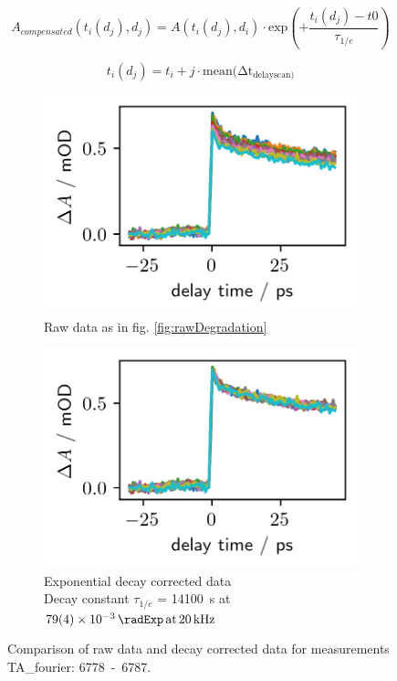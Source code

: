\documentclass[twoside,openright]{scrreprt}
\def\pumpExp#1{\ensuremath{\SI{#1}{\radExp}\,\mathrm{at}\, \SI{20}{\kilo\hertz}}}
\begin{document}
{\begin{equation}\label{eq:degradationCompensation}
A_{compensated}(t_i(d_j), d_j) = A(t_i(d_j), d_i)\cdot \mathrm{exp}\left(+\frac{t_i(d_j)-t0}{\tau_{1/e}}\right)
\end{equation}

\begin{equation*}
t_i(d_j) = t_i + j\cdot \mathrm{mean(\Delta t_{delay scan)}}
\end{equation*}

\begin{figure}[hbtp]
\centering
\begin{subfigure}[t]{0.4\linewidth}
\centering
\includegraphics[scale=1]{images/DegradationRAWPump653Probe493-Graph.png}
\caption{Raw data as in fig. \ref{fig:rawDegradation}}
\end{subfigure}
\hfill
\begin{subfigure}[t]{0.4\linewidth}
\centering
\includegraphics[scale=1]{images/DegradationCorrectedPump653Probe493-Graph.png}
\caption{Exponential decay corrected data\\
Decay constant $\tau_{1/e}$ = \SI{14100}{\second} at \pumpExp{79(4)e-3}}
\end{subfigure}
\caption{Comparison of raw data and decay corrected data for measurements TA\_fourier: \mbox{6778 - 6787}.\label{fig:degradationCorrectionComparison}}
\end{figure}



}
\end{document}
